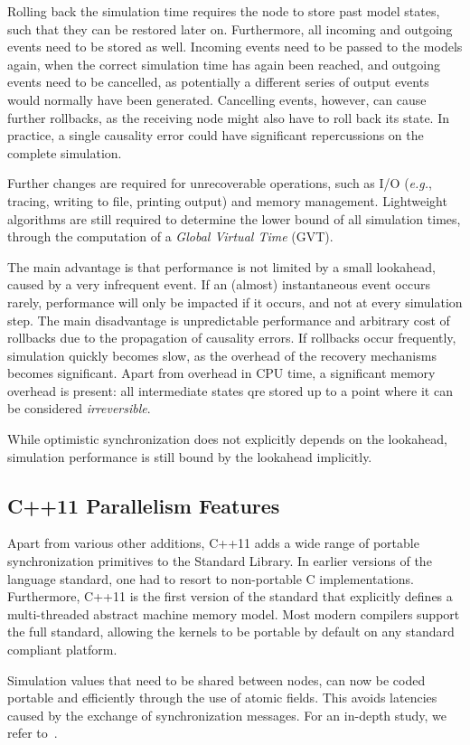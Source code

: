 Rolling back the simulation time requires the node to store past model states, such that they can be restored later on.
Furthermore, all incoming and outgoing events need to be stored as well.
Incoming events need to be passed to the models again, when the correct simulation time has again been reached, and outgoing events need to be cancelled, as potentially a different series of output events would normally have been generated.
Cancelling events, however, can cause further rollbacks, as the receiving node might also have to roll back its state.
In practice, a single causality error could have significant repercussions on the complete simulation.

Further changes are required for unrecoverable operations, such as I/O (\textit{e.g.}, tracing, writing to file, printing output) and memory management.
Lightweight algorithms are still required to determine the lower bound of all simulation times, through the computation of a \textit{Global Virtual Time} (GVT).

The main advantage is that performance is not limited by a small lookahead, caused by a very infrequent event.
If an (almost) instantaneous event occurs rarely, performance will only be impacted if it occurs, and not at every simulation step.
The main disadvantage is unpredictable performance and arbitrary cost of rollbacks due to the propagation of causality errors.
If rollbacks occur frequently, simulation quickly becomes slow, as the overhead of the recovery mechanisms becomes significant.
Apart from overhead in CPU time, a significant memory overhead is present: all intermediate states qre stored up to a point where it can be considered \textit{irreversible}.

While optimistic synchronization does not explicitly depends on the lookahead, simulation performance is still bound by the lookahead implicitly.

\subsection{C++11 Parallelism Features}
Apart from various other additions, C++11 adds a wide range of portable synchronization primitives to the Standard Library.
In earlier versions of the language standard, one had to resort to non-portable C implementations.
Furthermore, C++11 is the first version of the standard that explicitly defines a multi-threaded abstract machine memory model.
Most modern compilers support the full standard, allowing the kernels to be portable by default on any standard compliant platform. 

Simulation values that need to be shared between nodes, can now be coded portable and efficiently through the use of atomic fields.
This avoids latencies caused by the exchange of synchronization messages.
For an in-depth study, we refer to~\cite{CPE:CPE3007}.

